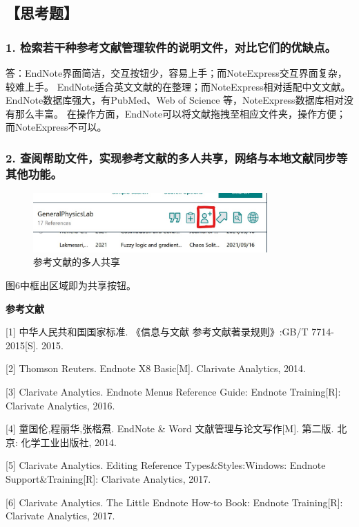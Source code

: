 \documentclass[12pt,a4paper,UTF8]{ctexart}
\begin{document}
\subsection*{【思考题】}

	\subsubsection*{1. 检索若干种参考文献管理软件的说明文件，对比它们的优缺点。}
	答：EndNote界面简洁，交互按钮少，容易上手；而NoteExpress交互界面复杂，较难上手。
	EndNote适合英文文献的在整理；而NoteExpress相对适配中文文献。
	EndNote数据库强大，有PubMed、Web of Science 等，NoteExpress数据库相对没有那么丰富。
	在操作方面，EndNote可以将文献拖拽至相应文件夹，操作方便；而NoteExpress不可以。

	\subsubsection*{2. 查阅帮助文件，实现参考文献的多人共享，网络与本地文献同步等其他功能。}
	
	\begin{figure}[htbp]
		\centering
		\includegraphics[width=0.8\textwidth]{img//share.jpg}
		\caption{参考文献的多人共享}
	\end{figure}


	
	图6中框出区域即为共享按钮。

	
	\newpage
	\begin{center}
		\textbf{参考文献}
	\end{center}

[1] 中华人民共和国国家标准. 《信息与文献 参考文献著录规则》:GB/T 7714-
2015[S]. 2015.

[2] Thomson Reuters. Endnote X8 Basic[M]. Clarivate Analytics, 2014.

[3] Clarivate Analytics. Endnote Menus Reference Guide: Endnote Training[R]:
Clarivate Analytics, 2016.

[4] 童国伦,程丽华,张楷焄. EndNote \& Word 文献管理与论文写作[M]. 第二版. 
北京: 化学工业出版社, 2014.

[5] Clarivate Analytics. Editing Reference Types\&Styles:Windows: Endnote 
Support\&Training[R]: Clarivate Analytics, 2017.

[6] Clarivate Analytics. The Little Endnote How-to Book: Endnote Training[R]:
Clarivate Analytics, 2017.
	
\end{document}
